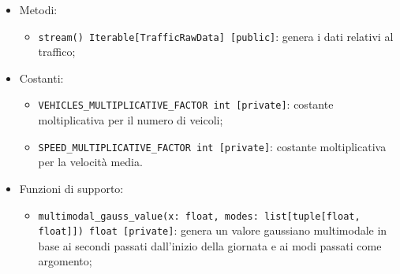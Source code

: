 \begin{itemize}
	      \begin{itemize}
		      \item Metodi:
		            \begin{itemize}
			            \item \texttt{stream() Iterable[TrafficRawData] [public]}: genera i dati relativi al traffico;
		            \end{itemize}
		      \item Costanti:
		            \begin{itemize}
			            \item \texttt{VEHICLES\_MULTIPLICATIVE\_FACTOR int [private]}: costante moltiplicativa per il numero di veicoli;
			            \item \texttt{SPEED\_MULTIPLICATIVE\_FACTOR int [private]}: costante moltiplicativa per la velocità media.
		            \end{itemize}
		      \item Funzioni di supporto:
		            \begin{itemize}
			            \item \texttt{multimodal\_gauss\_value(x: float, modes: list[tuple[float, float]]) float [private]}: genera un valore gaussiano multimodale in base ai secondi passati dall'inizio della giornata e ai modi passati come argomento;
		            \end{itemize}
	      \end{itemize}
\end{itemize}
